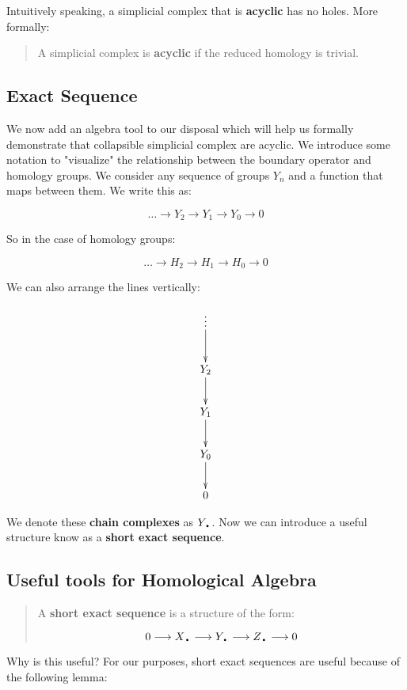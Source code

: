 \documentclass[letterpaper,12pt]{article}
\newcommand{\lra}{\longrightarrow}
\newcommand{\tb}{\text{\textbullet}}
\begin{document}
Intuitively speaking, a simplicial complex that is \textbf{acyclic} has no holes. More formally:

\begin{quote}
    A simplicial complex is \textbf{acyclic} if the reduced homology is trivial.
\end{quote}

\subsection{Exact Sequence}

We now add an algebra tool to our disposal which will help us formally demonstrate that collapsible simplicial complex are acyclic. We introduce some notation to "visualize" the relationship between the boundary operator and homology groups. We consider any sequence of groups $Y_n$ and a function that maps between them. We write this as:

$$\ldots \longrightarrow Y_2 \rightarrow Y_1 \rightarrow Y_0 \rightarrow 0 $$

So in the case of homology groups:

$$\ldots \rightarrow H_2 \rightarrow H_1 \rightarrow H_0 \rightarrow 0 $$

We can also arrange the lines vertically:

\begin{displaymath}
    \xymatrix{\vdots \ar[d] \\ Y_2 \ar[d] \\ Y_1 \ar[d] \\ Y_0 \ar[d] \\ 0 }
\end{displaymath}

We denote these \textbf{chain complexes} as $Y_{\tb}$. Now we can introduce a useful structure know as a \textbf{short exact sequence}.

\subsection{Useful tools for Homological Algebra}

\begin{quote}
    A \textbf{short exact sequence} is a structure of the form:

    $$0 \lra X_{\tb} \lra Y_{\tb} \lra Z_{\tb} \lra 0 $$

\end{quote}

Why is this useful? For our purposes, short exact sequences are useful because of the following lemma:
\end{document}
